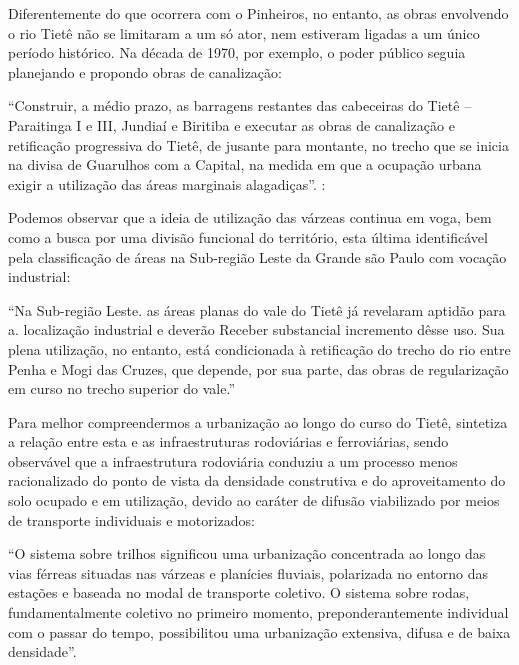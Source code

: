 \documentclass[
article,			%
11pt,				%
oneside,			%
a4paper,			%
english,			%
brazil,				%
sumario=tradicional
]{abntex2}
\begin{document}
	Diferentemente do que ocorrera com o Pinheiros, no entanto, as obras envolvendo o rio Tietê não se limitaram a um só ator, nem estiveram ligadas a um único período histórico. Na década de 1970, por exemplo, o poder público seguia planejando e propondo obras de canalização:
	
	\begin{citacao}
		``Construir, a médio prazo, as barragens restantes das cabeceiras do Tietê -- Paraitinga I e III, Jundiaí e Biritiba e executar as obras de canalização e retificação progressiva do Tietê, de jusante para montante, no trecho que se inicia na divisa de Guarulhos com a Capital, na medida em que a ocupação urbana exigir a utilização das áreas marginais alagadiças''. \cite[p. XVIII]{gegran1970a}:
	\end{citacao}
	
	Podemos observar que a ideia de utilização das várzeas continua em voga, bem como a busca por uma divisão funcional do território, esta última identificável pela classificação de áreas na Sub-região Leste da Grande são Paulo com vocação industrial:

	\begin{citacao}
		``Na Sub-região Leste. as áreas planas do vale do Tietê já revelaram aptidão para a. localização industrial e deverão Receber substancial incremento dêsse uso. Sua plena utilização, no entanto, está condicionada à retificação do trecho do rio entre Penha e Mogi das Cruzes, que depende, por sua parte, das obras de regularização em curso no trecho superior do vale.'' \cite[p. 6]{gegran1970a}
	\end{citacao}
	
	Para melhor compreendermos a urbanização ao longo do curso do Tietê,  sintetiza a relação entre esta e as infraestruturas rodoviárias e ferroviárias, sendo observável que a infraestrutura rodoviária conduziu a um processo menos racionalizado do ponto de vista da densidade construtiva e do aproveitamento do solo ocupado e em utilização, devido ao caráter de difusão viabilizado por meios de transporte individuais e motorizados:
	
	\begin{citacao}
		``O sistema sobre trilhos significou uma urbanização concentrada ao longo das vias férreas situadas nas várzeas e planícies fluviais, polarizada no entorno das estações e baseada no modal de transporte coletivo. O sistema sobre rodas, fundamentalmente coletivo no primeiro momento, preponderantemente individual com o passar do tempo, possibilitou uma urbanização extensiva, difusa e de baixa densidade''.
	\end{citacao}
	
\end{document}
